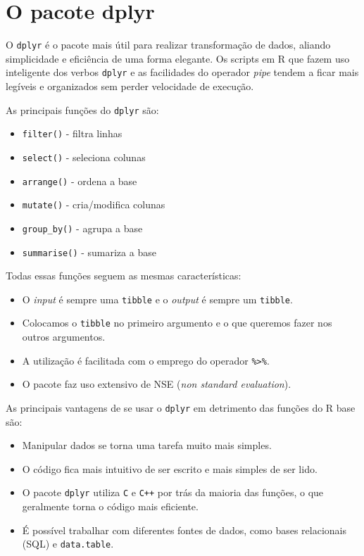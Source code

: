 \documentclass[
]{book}
\providecommand{\tightlist}{%
  \setlength{\itemsep}{0pt}\setlength{\parskip}{0pt}}
\begin{document}
\hypertarget{o-pacote-dplyr}{%
\section{O pacote dplyr}\label{o-pacote-dplyr}}

O \texttt{dplyr} é o pacote mais útil para realizar transformação de dados, aliando simplicidade e eficiência de uma forma elegante. Os scripts em R que fazem uso inteligente dos verbos \texttt{dplyr} e as facilidades do operador \emph{pipe} tendem a ficar mais legíveis e organizados sem perder velocidade de execução.

As principais funções do \texttt{dplyr} são:

\begin{itemize}
\tightlist
\item
  \texttt{filter()} - filtra linhas
\item
  \texttt{select()} - seleciona colunas
\item
  \texttt{arrange()} - ordena a base
\item
  \texttt{mutate()} - cria/modifica colunas
\item
  \texttt{group\_by()} - agrupa a base
\item
  \texttt{summarise()} - sumariza a base
\end{itemize}

Todas essas funções seguem as mesmas características:

\begin{itemize}
\tightlist
\item
  O \emph{input} é sempre uma \texttt{tibble} e o \emph{output} é sempre um \texttt{tibble}.
\item
  Colocamos o \texttt{tibble} no primeiro argumento e o que queremos fazer nos outros argumentos.
\item
  A utilização é facilitada com o emprego do operador \texttt{\%\textgreater{}\%}.
\item
  O pacote faz uso extensivo de NSE (\emph{non standard evaluation}).
\end{itemize}

As principais vantagens de se usar o \texttt{dplyr} em detrimento das funções do R base são:

\begin{itemize}
\tightlist
\item
  Manipular dados se torna uma tarefa muito mais simples.
\item
  O código fica mais intuitivo de ser escrito e mais simples de ser lido.
\item
  O pacote \texttt{dplyr} utiliza \texttt{C} e \texttt{C++} por trás da maioria das funções, o que geralmente torna o código mais eficiente.
\item
  É possível trabalhar com diferentes fontes de dados, como bases relacionais (SQL) e \texttt{data.table}.
\end{itemize}
\end{document}
